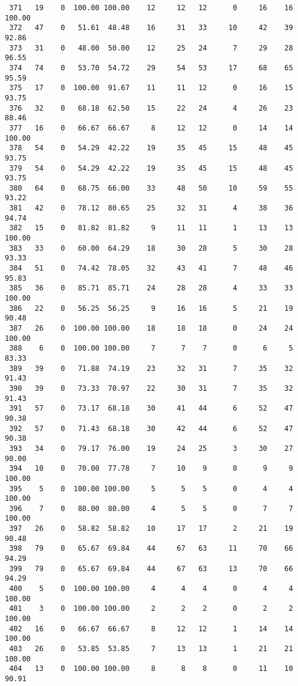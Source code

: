 \begin{verbatim}
 371   19    0  100.00 100.00    12     12   12      0     16    16   100.00
 372   47    0   51.61  48.48    16     31   33     10     42    39    92.86
 373   31    0   48.00  50.00    12     25   24      7     29    28    96.55
 374   74    0   53.70  54.72    29     54   53     17     68    65    95.59
 375   17    0  100.00  91.67    11     11   12      0     16    15    93.75
 376   32    0   68.18  62.50    15     22   24      4     26    23    88.46
 377   16    0   66.67  66.67     8     12   12      0     14    14   100.00
 378   54    0   54.29  42.22    19     35   45     15     48    45    93.75
 379   54    0   54.29  42.22    19     35   45     15     48    45    93.75
 380   64    0   68.75  66.00    33     48   50     10     59    55    93.22
 381   42    0   78.12  80.65    25     32   31      4     38    36    94.74
 382   15    0   81.82  81.82     9     11   11      1     13    13   100.00
 383   33    0   60.00  64.29    18     30   28      5     30    28    93.33
 384   51    0   74.42  78.05    32     43   41      7     48    46    95.83
 385   36    0   85.71  85.71    24     28   28      4     33    33   100.00
 386   22    0   56.25  56.25     9     16   16      5     21    19    90.48
 387   26    0  100.00 100.00    18     18   18      0     24    24   100.00
 388    6    0  100.00 100.00     7      7    7      0      6     5    83.33
 389   39    0   71.88  74.19    23     32   31      7     35    32    91.43
 390   39    0   73.33  70.97    22     30   31      7     35    32    91.43
 391   57    0   73.17  68.18    30     41   44      6     52    47    90.38
 392   57    0   71.43  68.18    30     42   44      6     52    47    90.38
 393   34    0   79.17  76.00    19     24   25      3     30    27    90.00
 394   10    0   70.00  77.78     7     10    9      0      9     9   100.00
 395    5    0  100.00 100.00     5      5    5      0      4     4   100.00
 396    7    0   80.00  80.00     4      5    5      0      7     7   100.00
 397   26    0   58.82  58.82    10     17   17      2     21    19    90.48
 398   79    0   65.67  69.84    44     67   63     11     70    66    94.29
 399   79    0   65.67  69.84    44     67   63     13     70    66    94.29
 400    5    0  100.00 100.00     4      4    4      0      4     4   100.00
 401    3    0  100.00 100.00     2      2    2      0      2     2   100.00
 402   16    0   66.67  66.67     8     12   12      1     14    14   100.00
 403   26    0   53.85  53.85     7     13   13      1     21    21   100.00
 404   13    0  100.00 100.00     8      8    8      0     11    10    90.91

\end{verbatim}
